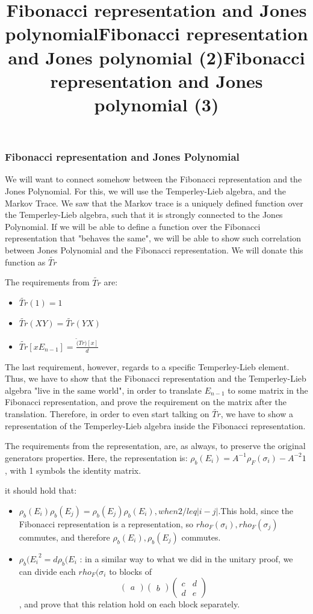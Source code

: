 \documentclass{article}
\begin{document}
\subsubsection{Fibonacci representation and Jones Polynomial}
\title{Fibonacci representation and Jones polynomial}
We will want to connect somehow between the Fibonacci representation and the Jones Polynomial.
For this, we will use the Temperley-Lieb algebra, and the Markov Trace. We saw that the Markov trace
is a uniquely defined function over the Temperley-Lieb algebra, such that it is strongly connected to the Jones Polynomial. If we will be able to define a function over the Fibonacci representation that "behaves the same", we will be able to show such correlation between Jones Polynomial and the Fibonacci representation. We will donate this function as $\tilde{Tr}$


\title{Fibonacci representation and Jones polynomial (2)}
The requirements from  $\tilde{Tr}$ are:
\begin{itemize}
\item $\tilde{Tr}(1) = 1$
\item $\tilde{Tr}(XY) = \tilde{Tr}(YX)$
\item  $ \tilde{Tr}[xE_{n-1}]=\frac{\tilde(Tr)[x]}{d}$    
\end{itemize}
The last requirement, however, regards to a specific Temperley-Lieb element. Thus, we have to show that the Fibonacci representation and the Temperley-Lieb algebra "live in the same world", in order to translate $E_{n-1}$ to some matrix in the Fibonacci representation, and prove the requirement on the matrix after the translation. Therefore, in order to even start talking on $\tilde{Tr}$, we have to show a representation of the Temperley-Lieb algebra inside the Fibonacci representation.  


\title{Fibonacci representation and Jones polynomial (3)}
The requirements from the representation, are, as always, to preserve the original generators properties.
Here, the representation is: $\rho_{b}(E_{i}) = A^{-1}\rho_{F}(\sigma_{i}) - A^{-2}1$ , with 1 symbols the identity matrix.

it should hold that:
\begin{itemize}
\item $\rho_{b}(E_{i})\rho_{b}(E_{j}) = \rho_{b}(E_{j})\rho_{b}(E_{i}), when 2 /leq |i-j|$.This hold, since the Fibonacci representation is a representation, so $rho_{F}(\sigma_{i}),rho_{F}(\sigma_{j})$ commutes, and therefore $\rho_{b}(E_{i}),\rho_{b}(E_{j})$ commutes.
\item  ${\rho_{b}(E_{i}}^{2} = d\rho_{b}(E_{i}$ : in a similar way to what we did in the unitary proof, we can divide each  $rho_{F}(\sigma_{i}$ to blocks of
\[
\begin{pmatrix} a \end{pmatrix}
\begin{pmatrix} b \end{pmatrix}
\begin{pmatrix} c & d \\ d & e \end{pmatrix}
\], and prove that this relation hold on each block separately.  
\end{itemize}
\end{document}
